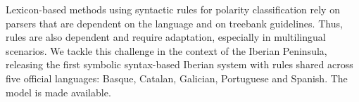 Lexicon-based methods using syntactic rules for polarity classification rely on parsers that are dependent on the language and on  treebank guidelines. Thus, rules are also dependent and require adaptation, especially in multilingual scenarios. We tackle this challenge in the context of the Iberian Peninsula, releasing the first symbolic syntax-based Iberian system with rules shared across five official languages: Basque, Catalan, Galician, Portuguese and Spanish. The model is made available.
